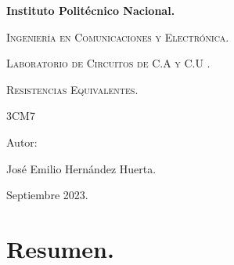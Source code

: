 \documentclass[10pt]{article}
\begin{document}
\pagestyle{fancy}
\cfoot{}


\lhead{}

\begin{titlepage}

	\begin{figure}[t]
		\hspace{0.6\textwidth}
	\end{figure}

	\centering
	{\bfseries\Huge Instituto Politécnico Nacional. \par}
	\vspace{1cm}
	{\scshape\Large Ingeniería en Comunicaciones y Electrónica. \par}
	\vspace{0.3cm}
	{\scshape\Large Laboratorio de Circuitos de C.A y C.U .  \par}
	\vspace{1cm}
	{\scshape\Huge Resistencias Equivalentes. \par}
	\vspace{1cm}
	{\Large 3CM7\par}
	\vfill
	{\Large Autor: \par}

	{\Large José Emilio Hernández Huerta. \par}

	\vfill
	{\Large Septiembre 2023. \par}

\end{titlepage}

\tableofcontents
\newpage

\section{Resumen.}
\end{document}
